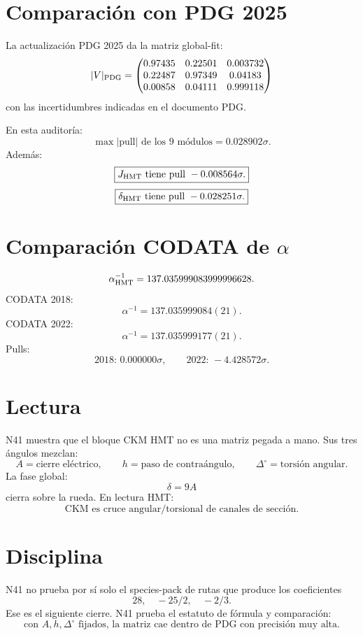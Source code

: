 \documentclass[11pt,a4paper]{article}
\begin{document}
\section{Comparación con PDG 2025}

La actualización PDG 2025 da la matriz global-fit:
\[
|V|_{\rm PDG}=
\begin{pmatrix}
0.97435 & 0.22501 & 0.003732\\
0.22487 & 0.97349 & 0.04183\\
0.00858 & 0.04111 & 0.999118
\end{pmatrix}
\]
con las incertidumbres indicadas en el documento PDG.

En esta auditoría:
\[
\boxed{\max |\text{pull}| \text{ de los 9 módulos}=0.028902\sigma.}
\]
Además:
\[
\boxed{J_{\rm HMT}\text{ tiene pull }-0.008564\sigma.}
\]
\[
\boxed{\delta_{\rm HMT}\text{ tiene pull }-0.028251\sigma.}
\]

\section{Comparación CODATA de \(\alpha\)}

\[
\alpha_{\rm HMT}^{-1}=137.035999083999996628.
\]
CODATA 2018:
\[
\alpha^{-1}=137.035999084(21).
\]
CODATA 2022:
\[
\alpha^{-1}=137.035999177(21).
\]
Pulls:
\[
\boxed{\text{2018: }0.000000\sigma,}
\qquad
\boxed{\text{2022: }-4.428572\sigma.}
\]

\section{Lectura}

N41 muestra que el bloque CKM HMT no es una matriz pegada a mano. Sus tres ángulos mezclan:
\[
A=\text{cierre eléctrico},
\qquad
h=\text{paso de contraángulo},
\qquad
\Delta^\circ=\text{torsión angular}.
\]
La fase global:
\[
\delta=9A
\]
cierra sobre la rueda. En lectura HMT:
\[
\boxed{\text{CKM es cruce angular/torsional de canales de sección.}}
\]

\section{Disciplina}

N41 no prueba por sí solo el species-pack de rutas que produce los coeficientes
\[
28,\quad -25/2,\quad -2/3.
\]
Ese es el siguiente cierre. N41 prueba el estatuto de fórmula y comparación:
\[
\boxed{\text{con } A,h,\Delta^\circ \text{ fijados, la matriz cae dentro de PDG con precisión muy alta.}}
\]
\end{document}
